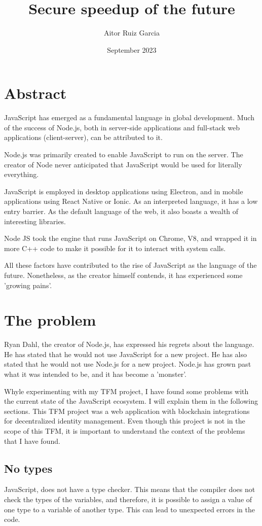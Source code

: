 \documentclass[12pt, letterpaper]{article}
\title{Secure speedup of the future}
\author{Aitor Ruiz Garcia}
\date{September 2023}
\begin{document}
\maketitle
\begin{multicols}{2}
    \section{Abstract}
    JavaScript has emerged as a fundamental language in global development. Much of the success of Node.js, both in server-side applications and full-stack web applications (client-server), can be attributed to it.

    Node.js was primarily created to enable JavaScript to run on the server. The creator of Node never anticipated that JavaScript would be used for literally everything.

    JavaScript is employed in desktop applications using Electron, and in mobile applications using React Native or Ionic. As an interpreted language, it has a low entry barrier. As the default language of the web, it also boasts a wealth of interesting libraries.

    Node JS took the engine that runs JavaScript on Chrome, V8, and wrapped it in more C++ code to make it possible for it to interact with system calls.

    All these factors have contributed to the rise of JavaScript as the language of the future. Nonetheless, as the creator himself contends, it has experienced some 'growing pains'.
    \section{The problem}

    Ryan Dahl, the creator of Node.js, has expressed his regrets about the language. He has stated that he would not use JavaScript for a new project. He has also stated that he would not use Node.js for a new project. Node.js has grown past what it was intended to be, and it has become a 'monster'.

    Whyle experimenting with my TFM project, I have found some problems with the current state of the JavaScript ecosystem. I will explain them in the following sections. This TFM project was a web application with blockchain integrations for decentralized identity management. Even though this project is not in the scope of this TFM, it is important to understand the context of the problems that I have found.

    \subsection{No types}
    JavaScript, does not have a type checker. This means that the compiler does not check the types of the variables, and therefore, it is possible to assign a value of one type to a variable of another type. This can lead to unexpected errors in the code.


\end{multicols}
\end{document}
